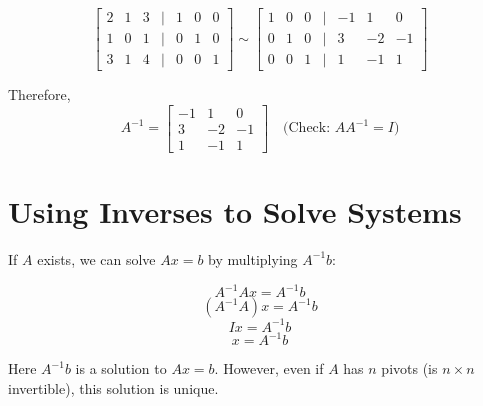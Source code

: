 \documentclass[12pt,a4paper]{article}
\begin{document}
\[
\begin{bmatrix}
2 & 1 & 3 & | & 1 & 0 & 0 \\
1 & 0 & 1 & | & 0 & 1 & 0 \\
3 & 1 & 4 & | & 0 & 0 & 1
\end{bmatrix}
\sim
\begin{bmatrix}
1 & 0 & 0 & | & -1 & 1 & 0 \\
0 & 1 & 0 & | & 3 & -2 & -1 \\
0 & 0 & 1 & | & 1 & -1 & 1
\end{bmatrix}
\]

Therefore, 
\[A^{-1} = \begin{bmatrix} -1 & 1 & 0 \\ 3 & -2 & -1 \\ 1 & -1 & 1 \end{bmatrix} \quad \text{(Check: } AA^{-1} = I\text{)}\]

\section{Using Inverses to Solve Systems}

If $A$ exists, we can solve $Ax = b$ by multiplying $A^{-1}b$:

\[A^{-1}Ax = A^{-1}b\]
\[(A^{-1}A)x = A^{-1}b\]
\[Ix = A^{-1}b\]
\[x = A^{-1}b\]

Here $A^{-1}b$ is a solution to $Ax = b$. However, even if $A$ has $n$ pivots (is $n \times n$ invertible), this solution is unique.
\end{document}
